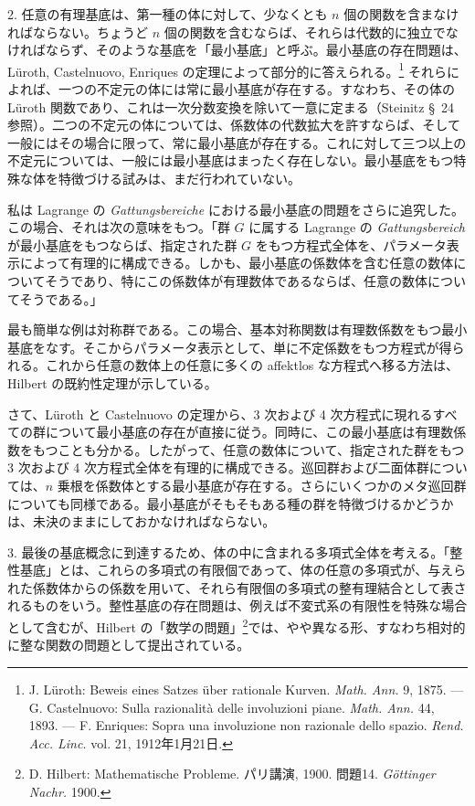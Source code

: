 \documentclass[11pt]{article}
\begin{document}
2. 任意の有理基底は、第一種の体に対して、少なくとも $n$ 個の関数を含まなければならない。ちょうど $n$ 個の関数を含むならば、それらは代数的に独立でなければならず、そのような基底を「最小基底」と呼ぶ。最小基底の存在問題は、Lüroth, Castelnuovo, Enriques の定理によって部分的に答えられる。\footnote{J. Lüroth: Beweis eines Satzes über rationale Kurven. \emph{Math. Ann.} 9, 1875. --- G. Castelnuovo: Sulla razionalità delle involuzioni piane. \emph{Math. Ann.} 44, 1893. --- F. Enriques: Sopra una involuzione non razionale dello spazio. \emph{Rend. Acc. Linc.} vol. 21, 1912年1月21日.} それらによれば、一つの不定元の体には常に最小基底が存在する。すなわち、その体の Lüroth 関数であり、これは一次分数変換を除いて一意に定まる（Steinitz \S\ 24 参照）。二つの不定元の体については、係数体の代数拡大を許すならば、そして一般にはその場合に限って、常に最小基底が存在する。これに対して三つ以上の不定元については、一般には最小基底はまったく存在しない。最小基底をもつ特殊な体を特徴づける試みは、まだ行われていない。

私は Lagrange の \emph{Gattungsbereiche} における最小基底の問題をさらに追究した。この場合、それは次の意味をもつ。「群 $G$ に属する Lagrange の \emph{Gattungsbereich} が最小基底をもつならば、指定された群 $G$ をもつ方程式全体を、パラメータ表示によって有理的に構成できる。しかも、最小基底の係数体を含む任意の数体についてそうであり、特にこの係数体が有理数体であるならば、任意の数体についてそうである。」

最も簡単な例は対称群である。この場合、基本対称関数は有理数係数をもつ最小基底をなす。そこからパラメータ表示として、単に不定係数をもつ方程式が得られる。これから任意の数体上の任意に多くの affektlos な方程式へ移る方法は、Hilbert の既約性定理が示している。

さて、Lüroth と Castelnuovo の定理から、3 次および 4 次方程式に現れるすべての群について最小基底の存在が直接に従う。同時に、この最小基底は有理数係数をもつことも分かる。したがって、任意の数体について、指定された群をもつ 3 次および 4 次方程式全体を有理的に構成できる。巡回群および二面体群については、$n$ 乗根を係数体とする最小基底が存在する。さらにいくつかのメタ巡回群についても同様である。最小基底がそもそもある種の群を特徴づけるかどうかは、未決のままにしておかなければならない。

3. 最後の基底概念に到達するため、体の中に含まれる多項式全体を考える。「整性基底」とは、これらの多項式の有限個であって、体の任意の多項式が、与えられた係数体からの係数を用いて、それら有限個の多項式の整有理結合として表されるものをいう。整性基底の存在問題は、例えば不変式系の有限性を特殊な場合として含むが、Hilbert の「数学の問題」\footnote{D. Hilbert: Mathematische Probleme. パリ講演, 1900. 問題14. \emph{Göttinger Nachr.} 1900.}では、やや異なる形、すなわち相対的に整な関数の問題として提出されている。
\end{document}
